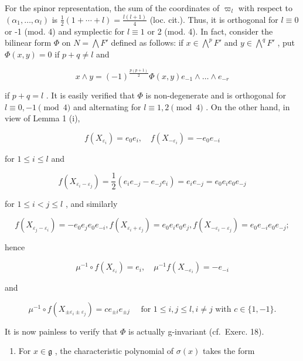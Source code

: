 For the spinor representation, the sum of the coordinates of \(\varpi_{l}\) with respect to \((\alpha_{1},\ldots,\alpha_{l})\) is \(\frac{1}{2}(1+\cdots+l)=\frac{l(l+1)}{4}\) (loc. cit.). Thus, it is orthogonal for \(l\equiv0\) or -1 (mod. 4) and symplectic for \(l\equiv1\) or 2 (mod. 4). In fact, consider the bilinear form \(\Phi\) on \(N=\bigwedge F'\) defined as follows: if \(x\in\bigwedge^{p}F'\) and \(y\in\bigwedge^{q}F'\) , put \(\Phi(x,y)=0\) if \(p+q\neq l\) and

\[
x \wedge y = (- 1) ^ {\frac {p (p + 1)}{2}} \varPhi (x, y) e _ {- 1} \wedge \dots \wedge e _ {- r}
\]

if \(p + q = l\) . It is easily verified that \(\Phi\) is non-degenerate and is orthogonal for \(l \equiv 0, -1 \pmod{4}\) and alternating for \(l \equiv 1, 2 \pmod{4}\) . On the other hand, in view of Lemma 1 (i),

\[
f (X _ {\varepsilon_ {i}}) = e _ {0} e _ {i}, \quad f (X _ {- \varepsilon_ {i}}) = - e _ {0} e _ {- i}
\]

for \(1 \leq i \leq l\) and

\[
f (X _ {\varepsilon_ {i} - \varepsilon_ {j}}) = \frac {1}{2} (e _ {i} e _ {- j} - e _ {- j} e _ {i}) = e _ {i} e _ {- j} = e _ {0} e _ {i} e _ {0} e _ {- j}
\]

for \(1 \leq i < j \leq l\) , and similarly

\[
f (X _ {\varepsilon_ {j} - \varepsilon_ {i}}) = - e _ {0} e _ {j} e _ {0} e _ {- i}, f (X _ {\varepsilon_ {i} + \varepsilon_ {j}}) = e _ {0} e _ {i} e _ {0} e _ {j}, f (X _ {- \varepsilon_ {i} - \varepsilon_ {j}}) = e _ {0} e _ {- i} e _ {0} e _ {- j};
\]

hence

\[
\mu^ {- 1} \circ f (X _ {\varepsilon_ {i}}) = e _ {i}, \quad \mu^ {- 1} f (X _ {- \varepsilon_ {i}}) = - e _ {- i}
\]

and

\[
\mu^ {- 1} \circ f (X _ {\pm \varepsilon_ {i} \pm \varepsilon_ {j}}) = c e _ {\pm i} e _ {\pm j} \quad \text {   for   } 1 \leq i, j \leq l, i \neq j \text {   with   } c \in \{1, - 1 \}.
\]

It is now painless to verify that \(\Phi\) is actually g-invariant (cf.~Exerc. 18).

\begin{enumerate}
\def\labelenumi{(\Roman{enumi})}
\setcounter{enumi}{5}
\tightlist
\item
  For \(x \in \mathfrak{g}\) , the characteristic polynomial of \(\sigma(x)\) takes the form
\end{enumerate}

